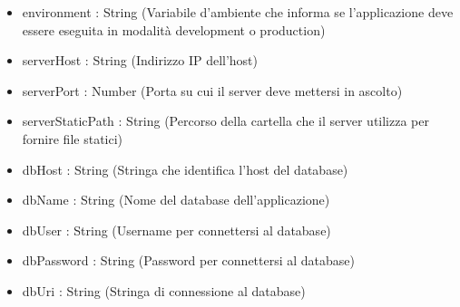\begin{description}
\begin{itemize}
\item environment : String (Variabile d'ambiente che informa se l'applicazione deve essere eseguita in modalità development o production)
\item serverHost : String (Indirizzo IP dell'host)
\item serverPort : Number (Porta su cui il server deve mettersi in ascolto)
\item serverStaticPath : String (Percorso della cartella che il server utilizza per fornire file statici)
\item dbHost : String (Stringa che identifica l'host del database)
\item dbName : String (Nome del database dell'applicazione)
\item dbUser : String (Username per connettersi al database)
\item dbPassword : String (Password per connettersi al database)
\item dbUri : String (Stringa di connessione al database)
\end{itemize}

\end{description}

\vspace{0.5cm}
